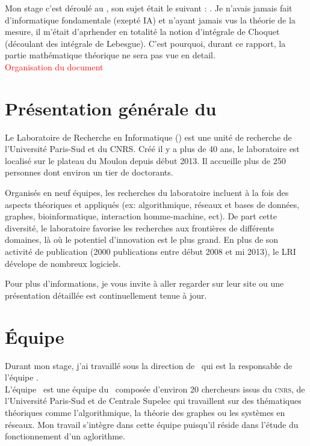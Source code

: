 
Mon stage c'est déroulé au \Lri, son sujet était le suivant : \textit{\sujet}.
Je n'avais jamais fait d'informatique fondamentale (exepté IA)
et n'ayant jamais vus la théorie de la mesure,
il m'était d'aprhender en totalité la notion d'intégrale de Choquet (découlant des intégrale de Lebesgue).
C'est pourquoi, durant ce rapport, la partie mathématique théorique ne sera pas vue en detail.\\
\textcolor{red}{Organisation du document}

\section{Présentation générale du \lri}
\label{sec:pglri}

Le Laboratoire de Recherche en Informatique (\lri) est une unité de recherche de l'Université
Paris-Sud et du \textsc{CNRS}.
Créé il y a plus de 40 ans, le laboratoire est localisé sur le plateau du Moulon depuis début 2013.
Il accueille plus de 250 personnes dont environ un tier de doctorants.


Organisés en neuf équipes, les recherches du laboratoire incluent à la fois des aspects théoriques et appliqués
(ex: algorithmique, réseaux et bases de données, graphes, bioinformatique, interaction homme-machine, ect).
De part cette diversité, le laboratoire favorise les recherches aux frontières de différents domaines,
là où le potentiel d'innovation est le plus grand.
En plus de son activité de publication (2000 publications entre début 2008 et mi 2013),
le LRI dévelope de nombreux logiciels.


Pour plus d'informations, je vous invite à aller regarder sur leur site
ou une présentation détaillée est continuellement tenue à jour\cite{LRI}.


\section{Équipe \galac}
\label{sec:galac}

Durant mon stage, j'ai travaillé sous la direction de \johanne\ qui est la responsable de l'équipe \galac. \\
L'équipe \galac\ est une équipe du \lri\ composée d'environ 20 chercheurs issus du \textsc{cnrs}, de l'Université
Paris-Sud et de Centrale Supelec qui travaillent sur des thématiques théoriques comme
l'algorithmique, la théorie des graphes ou les systèmes en réseaux.
Mon travail s'intègre dans cette équipe puisqu'il réside dans l'étude du fonctionnement d'un aglorithme.
